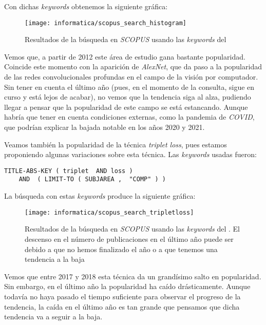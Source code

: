 Con dichas \textit{keywords} obtenemos la siguiente gráfica:

\begin{figure}[H]
	\centering
	\texttt{[image: informatica/scopus\_search\_histogram]}
	\caption{Resultados de la búsqueda en \textit{SCOPUS} usando las \textit{keywords} del }
\end{figure}

Vemos que, a partir de 2012 este área de estudio gana bastante popularidad. Coincide este momento con la aparición de \textit{AlexNet}, que da paso a la popularidad de las redes convolucionales profundas en el campo de la visión por computador. Sin tener en cuenta el último año (pues, en el momento de la consulta, sigue en curso y está lejos de acabar), no vemos que la tendencia siga al alza, pudiendo llegar a pensar que la popularidad de este campo se está estancando. Aunque habría que tener en cuenta condiciones externas, como la pandemia de \textit{COVID}, que podrían explicar la bajada notable en los años 2020 y 2021.

Veamos también la popularidad de la técnica \textit{triplet loss}, pues estamos proponiendo algunas variaciones sobre esta técnica. Las \textit{keywords} usadas fueron:

\begin{lstlisting}[caption=\textit{Keywords usadas para la búsqueda en \textit{SCOPUS} para consultar la popularidad del \textit{triplet loss}. Búsqueda realizada el 17 de Septiembre de 2023}, label=code:scopus_search_tripletloss, captionpos=b]
    TITLE-ABS-KEY ( triplet  AND loss )
    AND  ( LIMIT-TO ( SUBJAREA ,  "COMP" ) )
\end{lstlisting}

La búsqueda con estas \textit{keywords} produce la siguiente gráfica:

\begin{figure}[H]
	\centering
	\texttt{[image: informatica/scopus\_search\_tripletloss]}
	\caption{Resultados de la búsqueda en \textit{SCOPUS} usando las \textit{keywords} del . El descenso en el número de publicaciones en el último año puede ser debido a que no hemos finalizado el año o a que tenemos una tendencia a la baja}
\end{figure}

Vemos que entre 2017 y 2018 esta técnica da un grandísimo salto en popularidad. Sin embargo, en el último año la popularidad ha caído drásticamente. Aunque todavía no haya pasado el tiempo suficiente para observar el progreso de la tendencia, la caída en el último año es tan grande que pensamos que dicha tendencia va a seguir a la baja.

